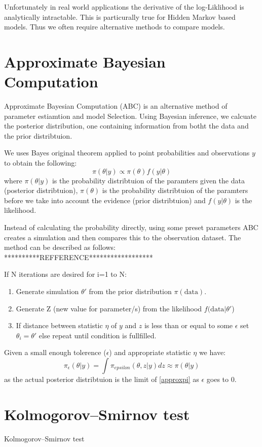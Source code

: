Unfortunately in real world applications the derivative of the log-Liklihood is analytically intractable. This is particurally true for Hidden Markov based models. Thus we often require alternative methods to compare models.


\section{Approximate Bayesian Computation}

Approximate Bayesian Computation (ABC) is an alternative method of parameter estiamtion and model Selection. Using Bayesian inference, we calcuate the posterior distribution, one containing information from botht the data and the prior distribtuion. 

We uses Bayes original theorem applied to point probabilities and observations $y$ to obtain the following:
\begin{equation}
    \pi(\theta | y) \propto \pi(\theta) f(y|\theta)
\end{equation} 
where $\pi(\theta | y)$ is the probability distribtuion of the paramters given the data (posterior distribtuion), $\pi(\theta)$ is the probability distribtuion of the paramters before we take into account the evidence (prior distribtuion) and $f(y|\theta)$ is the likelihood.

Instead of calculating the probability directly, using some preset parameters ABC creates a simulation and then compares this to the observation dataset. The method can be described as follows:
**********REFFERENCE******************

If N iterations are desired for i=1 to N:
\begin{enumerate}
    \item Generate simulation $\theta '$ from the prior distribution $\pi(\text{data})$.
    \item Generate Z (new value for parameter/s) from the likelihood $f(\text{data}|\theta '$)
    \item If distance between statistic $\eta$ of $y$ and $z$ is less than or equal to some $\epsilon$ set $\theta_i = \theta'$ else repeat until condition is fullfilled.
\end{enumerate}

Given a small enough tolerence ($\epsilon$) and appropriate statistic $\eta$ we have:
\begin{equation}
    \label{approxpi}
    \pi_{\epsilon}(\theta|y) = \int \pi_{epsilon}(\theta, z|y)dz \approx \pi(\theta|y)
\end{equation}
as the actual posterior distribtuion is the limit of \ref{approxpi} as $\epsilon$ goes to 0.


\section{Kolmogorov–Smirnov test}

Kolmogorov–Smirnov test
